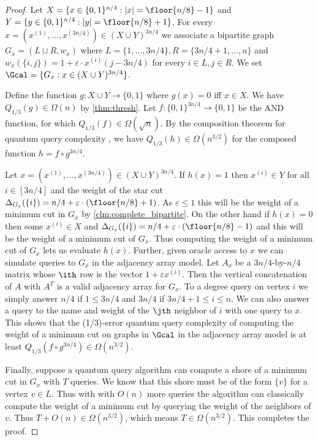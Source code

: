 
\begin{proof}
Let $X =\{x \in \{0,1\}^{n/4}: |x| = \floor{n/8}-1\}$ and $Y =\{y \in \{0,1\}^{n/4}: |y| = \floor{n/8}+1\}$.  For every 
$x = (x^{(1)}, \ldots, x^{(3n/4)}) \in (X \cup Y)^{3n/4}$ we associate a bipartite graph $G_x = (L \sqcup R, w_x)$ 
where $L = \{1, \ldots, 3n/4\}, R = \{3n/4+1, \ldots, n\}$ and $w_x(\{i,j\}) = 1+ \varepsilon \cdot x^{(i)}(j-3n/4)$ for every $i \in L, j \in R$.  We set $\Gcal = \{G_x : x \in (X \cup Y)^{3n/4}\}$.

Define the function $g: X \cup Y \rightarrow \{0,1\}$ where $g(x) = 0$ iff $x \in X$.  We have $Q_{1/3}(g) \in \Omega(n)$ by \cref{thm:thresh}.  
Let $f : \{0,1\}^{3n/4} \rightarrow \{0,1\}$ be the AND function, for which $Q_{1/3}(f) \in \Omega(\sqrt{n})$.  By the composition theorem for quantum query complexity \cite{HLS07,Rei11a}, 
we have $Q_{1/3}(h) \in \Omega(n^{3/2})$ for the composed function $h = f \circ g^{3n/4}$.   

Let $x = (x^{(1)}, \ldots, x^{(3n/4)}) \in (X \cup Y)^{3n/4}$.  If $h(x) = 1$ then $x^{(i)} \in Y$ for all $i \in [3n/4]$ and the weight of the star cut $\Delta_{G_x}(\{i\}) = n/4 + \varepsilon \cdot(\floor{n/8}+1)$.  
As $\varepsilon \le 1$ this will be the weight of a minimum cut in $G_x$ by \cref{clm:complete_bipartite}.  On the other hand if $h(x) = 0$ then some $x^{(i)} \in X$ and 
$\Delta_{G_x}(\{i\}) = n/4 + \varepsilon \cdot(\floor{n/8}-1)$ and this will be the weight of a minimum cut of $G_x$.
Thus computing the weight of a minimum cut of $G_x$ lets us evaluate $h(x)$.  Further, given oracle access to $x$ we can 
simulate queries to $G_x$ in the adjacency array model.  Let $A_x$ be a $3n/4$-by-$n/4$ matrix whose $\ith$ row is the vector $1+ \varepsilon x^{(i)}$.  Then the vertical concatenation of $A$ with 
$A^T$ is a valid adjacency array for $G_x$.  To a degree query on vertex $i$ we simply answer $n/4$ if $1 \le 3n/4$ and $3n/4$ if $3n/4+1 \le i \le n$.  We can also answer 
a query to the name and weight of the $\jth$ neighbor of $i$ with one query to $x$.  This shows that the (1/3)-error quantum query complexity of computing the weight of 
a minimum cut on graphs in $\Gcal$ in the adjacency array model is at least $Q_{1/3}(f \circ g^{3n/4}) \in \Omega(n^{3/2})$.  

Finally, suppose a quantum query algorithm can compute a shore of a minimum cut in $G_x$ with $T$ queries.  We know that this shore must be of the form $\{v\}$ for a vertex $v \in L$.  
Thus with with $O(n)$ more queries the algorithm can classically compute the weight of a 
minimum cut by querying the weight of the neighbors of $v$.  Thus $T + O(n) \in \Omega(n^{3/2})$, which means $T \in \Omega(n^{3/2})$.  This completes the proof.
\end{proof}

